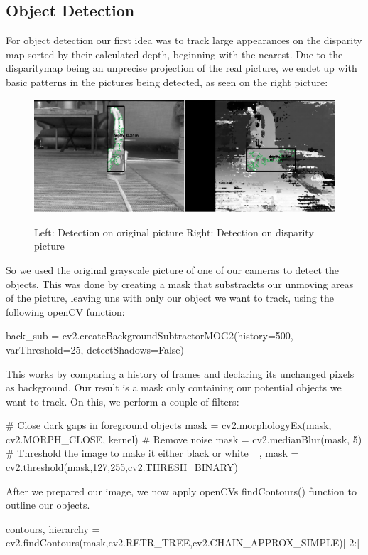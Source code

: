 \documentclass[journal,onecolumn]{IEEEtran}
\begin{document}
\subsection{Object Detection}
\noindent For object detection our first idea was to track large appearances on the disparity map sorted by their calculated depth, beginning with the nearest. Due to the disparitymap being an unprecise projection of the real picture, we endet up with basic patterns in the pictures being detected, as seen on the right picture:
\begin{figure}[H]
	\centering
	\includegraphics[scale=0.5]{handstand_comparison.png}
	\label{tracking}
	\captionsetup{justification=centering}
	\caption{Left: Detection on original picture Right: Detection on disparity picture }
\end{figure}
\noindent So we used the original grayscale picture of one of our cameras to detect the objects. This was done by creating a mask that substrackts our unmoving areas of the picture, leaving uns with only our object we want to track, using the following openCV function:
\begin{python}
back_sub = cv2.createBackgroundSubtractorMOG2(history=500, varThreshold=25, detectShadows=False)
\end{python}
\noindent This works by comparing a history of frames and declaring its unchanged pixels as background. Our result is a mask only containing our potential objects we want to track. On this, we perform a couple of filters:
\begin{python}
# Close dark gaps in foreground objects
mask = cv2.morphologyEx(mask, cv2.MORPH_CLOSE, kernel)
# Remove noise
mask = cv2.medianBlur(mask, 5) 
# Threshold the image to make it either black or white
_, mask = cv2.threshold(mask,127,255,cv2.THRESH_BINARY)
\end{python}
\noindent After we prepared our image, we now apply openCVs findContours() function to outline our objects. 
\begin{python}
contours, hierarchy = cv2.findContours(mask,cv2.RETR_TREE,cv2.CHAIN_APPROX_SIMPLE)[-2:]
\end{python}
\end{document}
